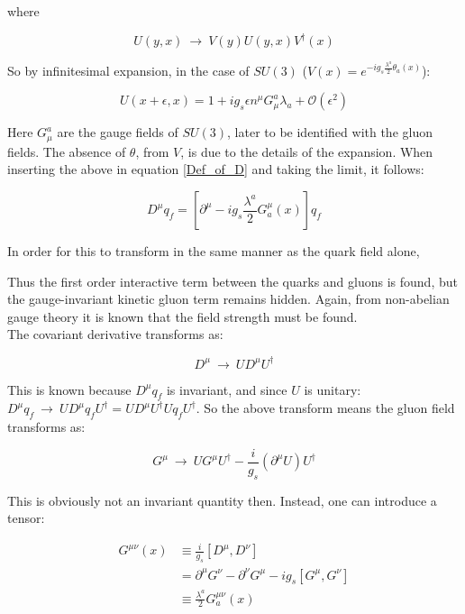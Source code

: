 \documentclass[11pt,a4paper]{article}
\begin{document}
where

\begin{equation}
	U(y,x) \:\rightarrow\: V(y)U(y,x)V^\dagger(x)
\end{equation}

So by infinitesimal expansion, in the case of $SU(3)$ ($V(x) = e^{-ig_s\frac{\lambda^a}{2}\theta_a(x)}$):

\begin{equation}
	U(x+\epsilon, x) = 1 + ig_s\epsilon n^\mu G_\mu^a \lambda_a + \mathcal{O}(\epsilon^2)
\end{equation}

Here $G_\mu^a$ are the gauge fields of $SU(3)$, later to be identified with the gluon fields. The absence of $\theta$, from $V$, is due to the details of the expansion. When inserting the above in equation \ref{Def_of_D} and taking the limit, it follows:

\begin{equation}
	D^\mu q_f = \left[ \partial^\mu - ig_s\frac{\lambda^a}{2}G_a^\mu(x) \right]q_f
\end{equation}

In order for this to transform in the same manner as the quark field alone,

Thus the first order interactive term between the quarks and gluons is found, but the gauge-invariant kinetic gluon term remains hidden. Again, from non-abelian gauge theory it is known that the field strength must be found.\\
The covariant derivative transforms as:

\begin{equation}
	D^\mu \:\rightarrow\: UD^\mu U^\dagger
\end{equation}

This is known because $D^\mu q_f$ is invariant, and since $U$ is unitary:$D^\mu q_f \:\rightarrow\: UD^\mu q_fU^\dagger = UD^\mu U^\dagger U q_fU^\dagger$. So the above transform means the gluon field transforms as:

\begin{equation}
	G^\mu \:\rightarrow\: UG^\mu U^\dagger - \frac{i}{g_s}(\partial^\mu U)U^\dagger
\end{equation}

This is obviously not an invariant quantity then. Instead, one can introduce a tensor:

\begin{align*}
	G^{\mu\nu}(x) &\equiv \frac{i}{g_s}[D^\mu,D^\nu]\\
	&= \partial^\mu G^\nu - \partial^\nu G^\mu - ig_s[G^\mu,G^\nu]\\
	&\equiv \frac{\lambda^a}{2}G_a^{\mu\nu}(x)
\end{align*}
\end{document}

